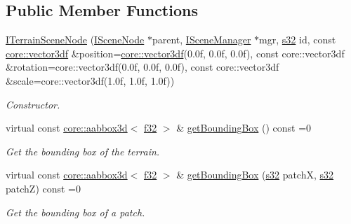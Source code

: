 \subsection*{Public Member Functions}
\begin{DoxyCompactItemize}
\item 
\mbox{\label{classirr_1_1scene_1_1ITerrainSceneNode_a152a472837bbce22d1221086a47d8af5}} 
\hyperlink{classirr_1_1scene_1_1ITerrainSceneNode_a152a472837bbce22d1221086a47d8af5}{I\+Terrain\+Scene\+Node} (\hyperlink{classirr_1_1scene_1_1ISceneNode}{I\+Scene\+Node} $\ast$parent, \hyperlink{classirr_1_1scene_1_1ISceneManager}{I\+Scene\+Manager} $\ast$mgr, \hyperlink{namespaceirr_ac66849b7a6ed16e30ebede579f9b47c6}{s32} id, const \hyperlink{namespaceirr_1_1core_a06f169d08b5c429f5575acb7edbad811}{core\+::vector3df} \&position=\hyperlink{namespaceirr_1_1core_a06f169d08b5c429f5575acb7edbad811}{core\+::vector3df}(0.\+0f, 0.\+0f, 0.\+0f), const core\+::vector3df \&rotation=core\+::vector3df(0.\+0f, 0.\+0f, 0.\+0f), const core\+::vector3df \&scale=core\+::vector3df(1.\+0f, 1.\+0f, 1.\+0f))
\begin{DoxyCompactList}\small\item\em Constructor. \end{DoxyCompactList}\item 
virtual const \hyperlink{classirr_1_1core_1_1aabbox3d}{core\+::aabbox3d}$<$ \hyperlink{namespaceirr_a0277be98d67dc26ff93b1a6a1d086b07}{f32} $>$ \& \hyperlink{classirr_1_1scene_1_1ITerrainSceneNode_a02a14fe28f5a326fca819c36bee2e92e}{get\+Bounding\+Box} () const =0
\begin{DoxyCompactList}\small\item\em Get the bounding box of the terrain. \end{DoxyCompactList}\item 
virtual const \hyperlink{classirr_1_1core_1_1aabbox3d}{core\+::aabbox3d}$<$ \hyperlink{namespaceirr_a0277be98d67dc26ff93b1a6a1d086b07}{f32} $>$ \& \hyperlink{classirr_1_1scene_1_1ITerrainSceneNode_a383501cc9c5cd30176f1f7ff6f8ab817}{get\+Bounding\+Box} (\hyperlink{namespaceirr_ac66849b7a6ed16e30ebede579f9b47c6}{s32} patchX, \hyperlink{namespaceirr_ac66849b7a6ed16e30ebede579f9b47c6}{s32} patchZ) const =0
\begin{DoxyCompactList}\small\item\em Get the bounding box of a patch. \end{DoxyCompactList}\item 

\end{DoxyCompactItemize}

